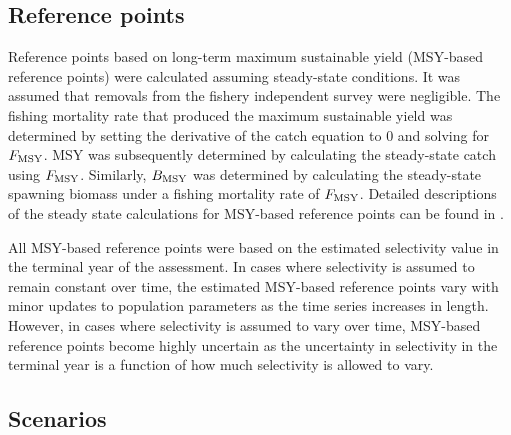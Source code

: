 \documentclass[review,letterpaper,10pt,authoryear]{elsarticle}
\begin{document}
\subsection*{Reference points} %
\label{sub:reference_points}
Reference points based on long-term maximum sustainable yield (MSY-based reference points) were calculated assuming steady-state conditions.  It was assumed that removals from the fishery independent survey were negligible.  The fishing mortality rate that produced the maximum sustainable yield was determined by setting the derivative of the catch equation to 0 and solving for $F_{\rm{MSY}}$.  MSY was subsequently determined by calculating the steady-state catch using $F_{\rm{MSY}}$.  Similarly, $B_{\rm{MSY}}$ was determined by calculating the steady-state spawning biomass under a fishing mortality rate of $F_{\rm{MSY}}$. Detailed descriptions of the steady state calculations for MSY-based reference points can be found in \cite{Martell2008pam}.

 All MSY-based reference points were based on the estimated selectivity value in the terminal year of the assessment.  In cases where selectivity is assumed to remain constant over time, the estimated MSY-based reference points vary with minor updates to population parameters as the time series increases in length.  However, in cases where selectivity is assumed to vary over time, MSY-based reference points become highly uncertain as the uncertainty in selectivity in the terminal year is a function of how much selectivity is allowed to vary.



\subsection*{Scenarios} %
\label{sub:scenarios}
\end{document}
